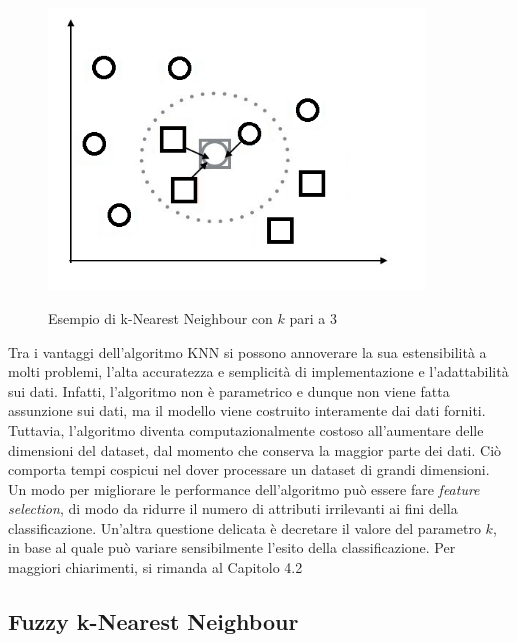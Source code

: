 \documentclass[11pt,  oneside, openany]{book}
\begin{document}
\begin{figure}[h!]
\begin{center}
  \includegraphics[width=10cm]{Immagini/KNN.png}\\
  \caption{Esempio di k-Nearest Neighbour con $k$ pari a 3}
\end{center}
\end{figure}

Tra i vantaggi dell'algoritmo KNN si possono annoverare la sua estensibilità a molti problemi, l'alta accuratezza e semplicità di implementazione e l'adattabilità sui dati. Infatti, l'algoritmo non è parametrico e dunque non viene fatta assunzione sui dati, ma il modello viene costruito interamente dai dati forniti. Tuttavia, l'algoritmo diventa computazionalmente costoso all'aumentare delle dimensioni del dataset, dal momento che conserva la maggior parte dei dati. Ciò comporta tempi cospicui nel dover processare un dataset di grandi dimensioni. Un modo per migliorare le performance dell'algoritmo può essere fare \textit{feature selection}, di modo da ridurre il numero di attributi irrilevanti ai fini della classificazione. Un'altra questione delicata è decretare il valore del parametro $k$, in base al quale può variare sensibilmente l'esito della classificazione. Per maggiori chiarimenti, si rimanda al Capitolo 4.2

\subsection{Fuzzy k-Nearest Neighbour}
\end{document}
